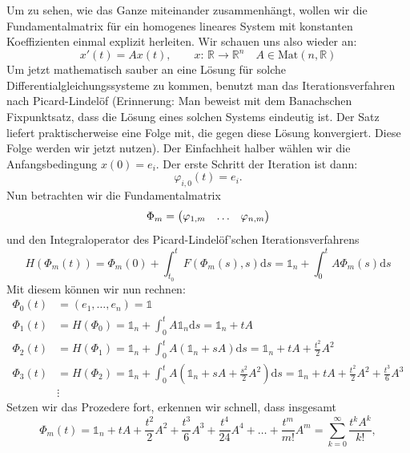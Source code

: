 Um zu sehen, wie das Ganze miteinander zusammenhängt, wollen wir die Fundamentalmatrix für ein homogenes lineares System mit konstanten Koeffizienten einmal explizit herleiten. Wir schauen uns also wieder an:
\begin{equation*}
    x'(t)=Ax(t), \quad \quad x:\,\mathbb{R}\rightarrow\mathbb{R}^n \quad A\in\text{Mat}(n,\mathbb{R})
\end{equation*}
Um jetzt mathematisch sauber an eine Lösung für solche Differentialgleichungssysteme zu kommen, benutzt man das Iterationsverfahren nach Picard-Lindelöf (Erinnerung: Man beweist mit dem Banachschen Fixpunktsatz, dass die Lösung eines solchen Systems eindeutig ist. Der Satz liefert praktischerweise eine Folge mit, die gegen diese Lösung konvergiert. Diese Folge werden wir jetzt nutzen). Der Einfachheit halber wählen wir die Anfangsbedingung $x(0)=e_i$. Der erste Schritt der Iteration ist dann:
\begin{equation*}
    \varphi_{i,0}(t)=e_i.
\end{equation*}
Nun betrachten wir die Fundamentalmatrix
\begin{equation*}
    \Phi_m=\begin{pmatrix}\varphi_{1,m}& \ldots&\varphi_{n,m}\end{pmatrix}
\end{equation*}
und den Integraloperator des Picard-Lindelöf'schen Iterationsverfahrens
\begin{equation*}
    H(\Phi_m(t))=\Phi_m(0)+\int_{t_0}^t F(\Phi_m(s),s)\text{d}s = \mathds{1}_n+\int_0^t A\Phi_m(s)\text{d}s
\end{equation*}
Mit diesem können wir nun rechnen:
\begin{align*}
    \Phi_0(t)&=(e_1 , \ldots, e_n) = \mathds{1} \\
    \Phi_1(t)&=H(\Phi_0)=\mathds{1}_n+\int_0^t A\mathds{1}_n\text{d}s = \mathds{1}_n+tA \\
    \Phi_2(t)&=H(\Phi_1)=\mathds{1}_n+\int_0^t A(\mathds{1}_n+sA)\text{d}s=\mathds{1}_n+tA+\frac{t^2}{2}A^2 \\
    \Phi_3(t)&=H(\Phi_2)=\mathds{1}_n+\int_0^t A(\mathds{1}_n+sA+\frac{s^2}{2}A^2)\text{d}s = \mathds{1}_n+tA+\frac{t^2}{2}A^2+\frac{t^3}{6}A^3 \\
    &\vdots
\end{align*}
Setzen wir das Prozedere fort, erkennen wir schnell, dass insgesamt
\begin{equation*}
    \Phi_m(t)=\mathds{1}_n+tA+\frac{t^2}{2}A^2+\frac{t^3}{6}A^3+\frac{t^4}{24}A^4+\ldots+\frac{t^m}{m!}A^m = \sum_{k=0}^\infty \frac{t^k A^k}{k!},
\end{equation*}
